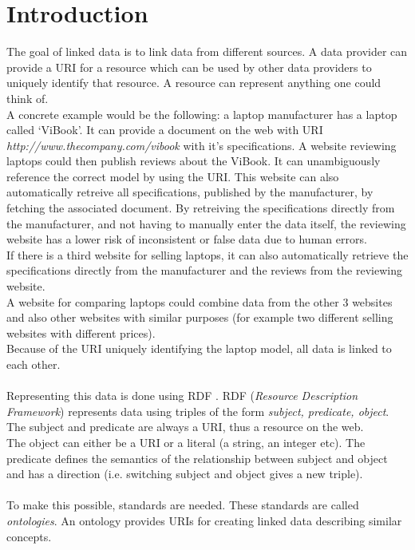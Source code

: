 \documentclass[a4paper]{report}
\begin{document}
    \chapter{Introduction}
    The goal of linked data is to link data from different sources. A data provider can provide a URI for a resource which can be used by other data providers to uniquely identify that resource. A resource can represent anything one could think of.\\
    A concrete example would be the following: a laptop manufacturer has a laptop called `ViBook'. It can provide a document on the web with URI \\ \textit{http://www.thecompany.com/vibook} with it's specifications.
    A website reviewing laptops could then publish reviews about the ViBook. It can unambiguously reference the correct model by using the URI. This website can also automatically retreive all specifications, published by the manufacturer, by fetching the associated document.
    By retreiving the specifications directly from the manufacturer, and not having to manually enter the data itself, the reviewing website has a lower risk of inconsistent or false data due to human errors.\\
    If there is a third website for selling laptops, it can also automatically retrieve the specifications directly from the manufacturer and the reviews from the reviewing website.\\
    A website for comparing laptops could combine data from the other 3 websites and also other websites with similar purposes (for example two different selling websites with different prices).\\
    Because of the URI uniquely identifying the laptop model, all data is linked to each other.\\ \\
    Representing this data is done using RDF \cite{rdf}. RDF (\textit{Resource Description Framework}) represents data using triples of the form \textit{subject, predicate, object}. The subject and predicate are always a URI, thus a resource on the web.\\
    The object can either be a URI or a literal (a string, an integer etc). The predicate defines the semantics of the relationship between subject and object and has a direction (i.e. switching subject and object gives a new triple).\\ \\
    To make this possible, standards are needed. These standards are called \emph{ontologies}. An ontology provides URIs for creating linked data describing similar concepts.\\
\end{document}
